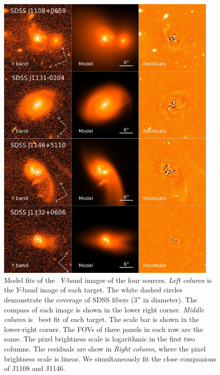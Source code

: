 \begin{figure}[!htpb]
\begin{center}
\includegraphics[width=0.95\textwidth]{../_demoResources/figs/zhihu/IR_galfit.pdf}
\caption{
Model fits of the \hst\ $Y$-band images of the four sources. 
{\it Left column} is the $Y$-band image of each target. 
The white dashed circles demonstrate the coverage of SDSS fibers ($3''$ in diameter). 
The compass of each image is shown in the lower right corner. 
{\it Middle column} is \galfit\ best fit of each target. 
The scale bar is shown in the lower-right corner. 
The FOVs of three panels in each row are the same. 
The pixel brightness scale is logarithmic in the first two columns. 
The residuals are show in {\it Right column}, where the pixel brightness scale is linear. 
We simultaneously fit the close companions of J1108 and J1146.
}
\label{fig:galfit}
\end{center}
\end{figure}





